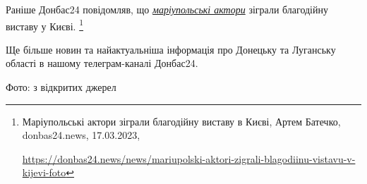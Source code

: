 Раніше Донбас24 повідомляв, що \href{https://donbas24.news/news/mariupolski-aktori-zigrali-blagodiinu-vistavu-v-kijevi-foto}{\emph{маріупольські актори}} зіграли благодійну виставу
у Києві.%
\footnote{Маріупольські актори зіграли благодійну виставу в Києві, Артем Батечко, donbas24.news, 17.03.2023, \par%
\url{https://donbas24.news/news/mariupolski-aktori-zigrali-blagodiinu-vistavu-v-kijevi-foto}%
}

Ще більше новин та найактуальніша інформація про Донецьку та Луганську області
в нашому телеграм-каналі Донбас24.

Фото: з відкритих джерел

